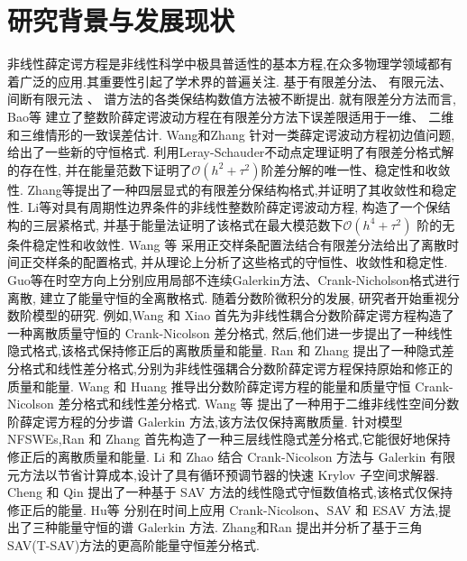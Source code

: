 \section{研究背景与发展现状}
非线性薛定谔方程是非线性科学中极具普适性的基本方程,在众多物理学领域都有着广泛的应用.其重要性引起了学术界的普遍关注. 基于有限差分法\cite{liFastEnergyConserving2018}、 有限元法\cite{karakashianSpacetimeFiniteElement1998}、 间断有限元法\cite{zhangConservativeLocalDiscontinuous2017} 、 谱方法\cite{gongConservativeFourierPseudospectral2017}的各类保结构数值方法被不断提出. 
就有限差分方法而言, Bao等\cite{baoUniformErrorEstimates2012} 建立了整数阶薛定谔波动方程在有限差分方法下误差限适用于一维、 二维和三维情形的一致误差估计. 
Wang和Zhang\cite{wangAnalysisNewConservative2006} 针对一类薛定谔波动方程初边值问题, 给出了一些新的守恒格式. 利用Leray-Schauder不动点定理证明了有限差分格式解的存在性,
并在能量范数下证明了$\mathcal{O}(h^2+\tau^2)$阶差分解的唯一性、稳定性和收敛性. Zhang等\cite{zhangConservativeNumericalScheme2003}提出了一种四层显式的有限差分保结构格式,并证明了其收敛性和稳定性. 
Li等\cite{liCompactFiniteDifference2012}对具有周期性边界条件的非线性整数阶薛定谔波动方程, 构造了一个保结构的三层紧格式, 并基于能量法证明了该格式在最大模范数下$\mathcal{O}(h^4+\tau^2)$ 阶的无条件稳定性和收敛性. 
Wang 等\cite{wangDiscretetimeOrthogonalSpline2011} 采用正交样条配置法结合有限差分法给出了离散时间正交样条的配置格式, 并从理论上分析了这些格式的守恒性、收敛性和稳定性. 
Guo等\cite{guoEnergyConservingLocal2015}在时空方向上分别应用局部不连续Galerkin方法、Crank-Nicholson格式进行离散, 建立了能量守恒的全离散格式. 
随着分数阶微积分的发展, 研究者开始重视分数阶模型的研究.
例如,Wang 和 Xiao \cite{wangCrankNicolsonDifference2013} 首先为非线性耦合分数阶薛定谔方程构造了一种离散质量守恒的 Crank-Nicolson 差分格式,
然后,他们进一步提出了一种线性隐式格式,该格式保持修正后的离散质量和能量\cite{wangLinearlyImplicitConservative2014}. 
Ran 和 Zhang \cite{ranConservativeDifferenceScheme2016} 提出了一种隐式差分格式和线性差分格式,分别为非线性强耦合分数阶薛定谔方程保持原始和修正的质量和能量. 
Wang 和 Huang \cite{wangEnergyConservativeDifference2015,wangConservativeLinearizedDifference2015} 推导出分数阶薛定谔方程的能量和质量守恒 Crank-Nicolson 差分格式和线性差分格式.
Wang 等 \cite{wangSplitstepSpectralGalerkin2019} 提出了一种用于二维非线性空间分数阶薛定谔方程的分步谱 Galerkin 方法,该方法仅保持离散质量.
针对模型NFSWEs,Ran 和 Zhang \cite{ranLinearlyImplicitConservative2016} 首先构造了一种三层线性隐式差分格式,它能很好地保持修正后的离散质量和能量. 
Li 和 Zhao \cite{liFastEnergyConserving2018} 结合 Crank-Nicolson 方法与 Galerkin 有限元方法以节省计算成本,设计了具有循环预调节器的快速 Krylov 子空间求解器. 
Cheng 和 Qin \cite{chengConvergenceEnergyconservingScheme2022} 提出了一种基于 SAV 方法的线性隐式守恒数值格式,该格式仅保持修正后的能量.
Hu等 \cite{huEfficientEnergyPreserving2022} 分别在时间上应用 Crank-Nicolson、SAV 和 ESAV 方法,提出了三种能量守恒的谱 Galerkin 方法.
Zhang和Ran \cite{zhangHighorderStructurepreservingDifference2023} 提出并分析了基于三角SAV(T-SAV)方法的更高阶能量守恒差分格式.


